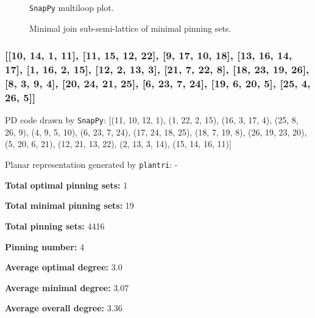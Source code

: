 \documentclass{article}%
\begin{document}
\begin{multicols}{2}
\begin{figure}[H]
\centering

\caption{\texttt{SnapPy} multiloop plot.}
\label{fig:tex/img/[[7, 26, 8, 1], [13, 6, 14, 7], [14, 25, 15, 26], [8, 15, 9, 16], [1, 16, 2, 17], [17, 12, 18, 13], [18, 5, 19, 6], [19, 24, 20, 25], [9, 20, 10, 21], [2, 21, 3, 22], [22, 11, 23, 12], [23, 4, 24, 5],.svg}
\end{figure}
\columnbreak

\begin{figure}[H]
\centering
\scalebox{0.8}{}
\caption{Minimal join sub-semi-lattice of minimal pinning sets.}
\label{fig:tex/img/[[7, 26, 8, 1], [13, 6, 14, 7], [14, 25, 15, 26], [8, 15, 9, 16], [1, 16, 2, 17], [17, 12, 18, 13], [18, 5, 19, 6], [19, 24, 20, 25], [9, 20, 10, 21], [2, 21, 3, 22], [22, 11, 23, 12], [23, 4, 24, 5],.pgf}
\end{figure}
\end{multicols}

\newpage

\subsubsection{[[10, 14, 1, 11], [11, 15, 12, 22], [9, 17, 10, 18], [13, 16, 14, 17], [1, 16, 2, 15], [12, 2, 13, 3], [21, 7, 22, 8], [18, 23, 19, 26], [8, 3, 9, 4], [20, 24, 21, 25], [6, 23, 7, 24], [19, 6, 20, 5], [25, 4, 26, 5]]}

{\small\noindent PD code drawn by \texttt{SnapPy}: [(11, 10, 12, 1), (1, 22, 2, 15), (16, 3, 17, 4), (25, 8, 26, 9), (4, 9, 5, 10), (6, 23, 7, 24), (17, 24, 18, 25), (18, 7, 19, 8), (26, 19, 23, 20), (5, 20, 6, 21), (12, 21, 13, 22), (2, 13, 3, 14), (15, 14, 16, 11)]}

{\small\noindent Planar representation generated by \texttt{plantri}: -}

\begin{multicols}{2}
{\normalsize \noindent\textbf{Total optimal pinning sets:} 1

\noindent\textbf{Total minimal pinning sets:} 19

\noindent\textbf{Total pinning sets:} 4416

\noindent\textbf{Pinning number:} 4

}
\columnbreak

{\normalsize \noindent\textbf{Average optimal degree:} 3.0

\noindent\textbf{Average minimal degree:} 3.07

\noindent\textbf{Average overall degree:} 3.36

}
\end{multicols}
\end{document}
